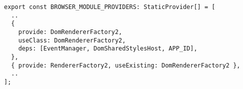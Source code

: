 \begin{verbatim}
export const BROWSER_MODULE_PROVIDERS: StaticProvider[] = [
  ..
  {
    provide: DomRendererFactory2,
    useClass: DomRendererFactory2,
    deps: [EventManager, DomSharedStylesHost, APP_ID],
  },
  { provide: RendererFactory2, useExisting: DomRendererFactory2 },
  ..
];
\end{verbatim}
